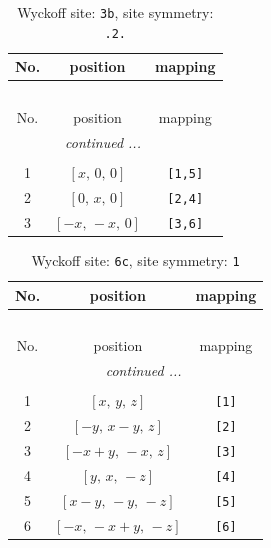 \documentclass[fleqn,8pt]{jsarticle}
\begin{document}
\begin{longtable}{ccc}
\caption{Wyckoff site: {\tt 3b}, site symmetry: {\tt .2.}}
 \\
 \hline \hline
No. & position & mapping \\ \hline \endfirsthead

\multicolumn{2}{l}{\tablename\ \thetable{}} \\
 \hline \hline
No. & position & mapping \\ \hline \endhead

 \hline \hline
\multicolumn{2}{r}{\footnotesize\it continued ...} \\ \endfoot

 \hline \hline
\multicolumn{2}{r}{} \\ \endlastfoot

1 & $\left[ x,\, 0,\, 0 \right]$ & {\tt [1,5]} \\ \hline
2 & $\left[ 0,\, x,\, 0 \right]$ & {\tt [2,4]} \\ \hline
3 & $\left[ - x,\, - x,\, 0 \right]$ & {\tt [3,6]} \\
\end{longtable}
\renewcommand{\arraystretch}{1.2}
\begin{longtable}{ccc}
\caption{Wyckoff site: {\tt 6c}, site symmetry: {\tt 1}}
 \\
 \hline \hline
No. & position & mapping \\ \hline \endfirsthead

\multicolumn{2}{l}{\tablename\ \thetable{}} \\
 \hline \hline
No. & position & mapping \\ \hline \endhead

 \hline \hline
\multicolumn{2}{r}{\footnotesize\it continued ...} \\ \endfoot

 \hline \hline
\multicolumn{2}{r}{} \\ \endlastfoot

1 & $\left[ x,\, y,\, z \right]$ & {\tt [1]} \\ \hline
2 & $\left[ - y,\, x - y,\, z \right]$ & {\tt [2]} \\ \hline
3 & $\left[ - x + y,\, - x,\, z \right]$ & {\tt [3]} \\ \hline
4 & $\left[ y,\, x,\, - z \right]$ & {\tt [4]} \\ \hline
5 & $\left[ x - y,\, - y,\, - z \right]$ & {\tt [5]} \\ \hline
6 & $\left[ - x,\, - x + y,\, - z \right]$ & {\tt [6]} \\
\end{longtable}
\end{document}
